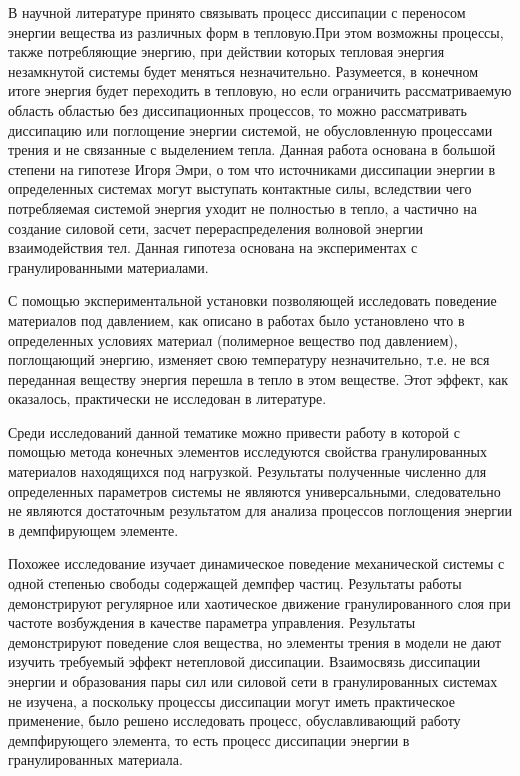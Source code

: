 В научной литературе принято связывать процесс диссипации с переносом энергии
вещества из различных форм в тепловую.При этом возможны процессы, также потребляющие энергию, при действии которых
тепловая энергия незамкнутой системы будет меняться незначительно. Разумеется, в
конечном итоге энергия будет переходить в тепловую, но если ограничить
рассматриваемую область областью без диссипационных процессов, то можно
рассматривать диссипацию или поглощение энергии системой, не обусловленную
процессами трения и не связанные с выделением тепла.
Данная работа основана в большой степени на гипотезе Игоря Эмри, о том что
источниками диссипации энергии в определенных системах могут выступать контактные
силы, вследствии чего потребляемая системой энергия уходит не полностью в тепло, а
частично на создание силовой сети, засчет перераспределения волновой энергии взаимодействия тел. Данная гипотеза основана на экспериментах \cite{work2, work7} с
гранулированными материалами. 

С помощью экспериментальной установки \cite{work2} позволяющей исследовать поведение
материалов под давлением, как описано в работах \cite{work2, work7} было установлено что в
определенных условиях материал (полимерное вещество под давлением), поглощающий
энергию, изменяет свою температуру незначительно, т.е. не вся переданная веществу
энергия перешла в тепло в этом веществе. Этот эффект, как оказалось, практически не
исследован в литературе.

Среди исследований данной тематике можно привести работу \cite{work10} в которой с помощью
метода конечных элементов исследуются свойства гранулированных материалов
находящихся под нагрузкой. Результаты полученные численно для определенных
параметров системы не являются универсальными, следовательно не являются
достаточным результатом для анализа процессов поглощения энергии в демпфирующем
элементе.

Похожее исследование \cite{work11} изучает динамическое поведение механической системы с
одной степенью свободы содержащей демпфер частиц.
Результаты работы демонстрируют регулярное или хаотическое движение
гранулированного слоя при частоте возбуждения в качестве параметра управления.
Результаты демонстрируют поведение слоя вещества, но элементы трения в модели не
дают изучить требуемый эффект нетепловой диссипации.
Взаимосвязь диссипации энергии и образования пары сил или силовой сети в
гранулированных системах не изучена, а поскольку процессы диссипации могут иметь
практическое применение, было решено исследовать процесс, обуславливающий работу
демпфирующего элемента, то есть процесс диссипации энергии в гранулированных
материала.


